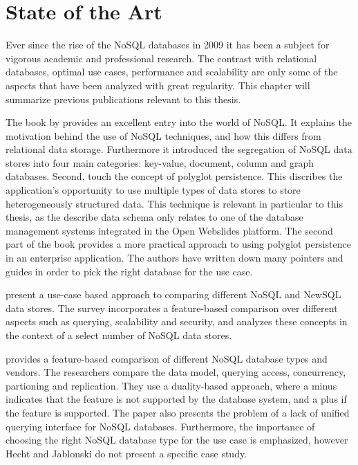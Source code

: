 \chapter{State of the Art}
\label{ch:state-of-the-art}

Ever since the rise of the NoSQL databases in 2009 \autocite{Sadalage2012} it has been a subject for vigorous academic and professional research. The contrast with relational databases, optimal use cases, performance and scalability are only some of the aspects that have been analyzed with great regularity. This chapter will summarize previous publications relevant to this thesis.


The book by \textcite{Sadalage2012} provides an excellent entry into the world of NoSQL. It explains the motivation behind the use of NoSQL techniques, and how this differs from relational data storage. Furthermore it introduced the segregation of NoSQL data stores into four main categories: key-value, document, column and graph databases.
Second, \citeauthor{Sadalage2012} touch the concept of polyglot persistence. This discribes the application's opportunity to use multiple types of data stores to store heterogeneously structured data. This technique is relevant in particular to this thesis, as the describe data schema only relates to one of the database management systems integrated in the Open Webslides platform.
The second part of the book provides a more practical approach to using polyglot persistence in an enterprise application. The authors have written down many pointers and guides in order to pick the right database for the use case.

\textcite{Grolinger2013} present a use-case based approach to comparing different NoSQL and NewSQL data stores. The survey incorporates a feature-based comparison over different aspects such as querying, scalability and security, and analyzes these concepts in the context of a select number of NoSQL data stores.

\textcite{Hecht2011} provides a feature-based comparison of different NoSQL database types and vendors. The researchers compare the data model, querying access, concurrency, partioning and replication. They use a duality-based approach, where a minus indicates that the feature is not supported by the database system, and a plus if the feature is supported. The paper also presents the problem of a lack of unified querying interface for NoSQL databases. Furthermore, the importance of choosing the right NoSQL database type for the use case is emphasized, however Hecht and Jablonski do not present a specific case study.


